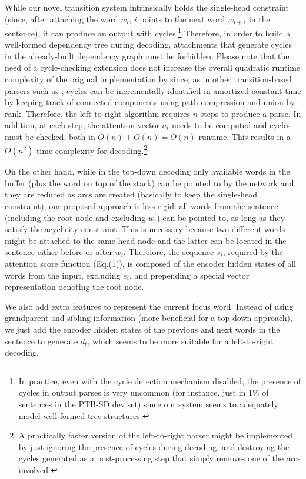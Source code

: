 \documentclass[11pt,a4paper]{article}
\begin{document}
While our novel transition system intrinsically holds the single-head constraint (since, after attaching the word $w_i$, $i$ points to the next word $w_{i+1}$ in the sentence), it can produce an output with cycles.\footnote{In practice, even with the cycle detection mechanism disabled, the presence of cycles in output parses is very uncommon (for instance, just in 1\% of sentences in the PTB-SD dev set) since our system seems to adequately model well-formed tree structures.} Therefore, in order to build a well-formed dependency tree during decoding, attachments that generate cycles in the already-built dependency graph must be forbidden. Please note that the need of a cycle-checking extension does not increase the overall quadratic runtime complexity of the original implementation by \citet{Ma18} since, as in other transition-based parsers such as \cite{covington01fundamental,gomniv2010}, cycles can be incrementally identified in amortized constant time by keeping track of connected components using path compression and union by rank. Therefore, the left-to-right algorithm requires $n$ steps to produce a parse. In addition, at each step, the attention vector $a_t$ needs to be computed and cycles must be checked, both in $O(n)+O(n)=O(n)$ runtime. This results in a $O(n^2)$ time complexity for decoding.\footnote{A practically faster version of the left-to-right parser might be implemented by just ignoring the presence of cycles during decoding, and destroying the cycles generated as a post-processing step that simply removes one of the arcs involved.} 

 On the other hand, while in the top-down decoding only available words in the buffer (plus the word on top of the stack) can be pointed to by the network and they are reduced as arcs are 
 created (basically to keep the single-head constraint); our proposed approach is less rigid: all words from the sentence (including the root node and excluding $w_i$) can be pointed to, 
 as long as they satisfy the acyclicity constraint. This is necessary because two different words might be attached to the same head node and the latter can be located in the sentence either before or after $w_i$. Therefore, the sequence $s_i$, required by the attention score function (Eq.(1)), is composed of the encoder hidden states of all words from the input, excluding $e_i$, and prepending a special vector representation denoting the root node.
 
 
We also add extra features to represent the current focus word. Instead of using grandparent and sibling information (more beneficial for a top-down approach), we just add the encoder hidden states of the previous and next words in the sentence to generate $d_t$, which seems to be more suitable for a left-to-right decoding.
\end{document}
